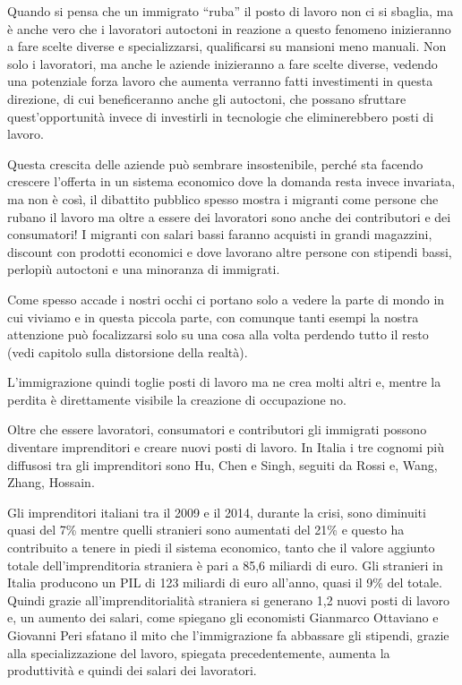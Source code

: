 \documentclass[12pt]{book} %
\begin{document}
Quando si pensa che un immigrato “ruba” il posto di lavoro non ci si sbaglia, ma è anche vero che i lavoratori autoctoni
in reazione a questo fenomeno inizieranno a fare scelte diverse e specializzarsi, qualificarsi su mansioni meno
manuali. Non solo i lavoratori, ma anche le aziende inizieranno a fare scelte diverse, vedendo una potenziale forza
lavoro che aumenta verranno fatti investimenti in questa direzione, di cui beneficeranno anche gli autoctoni, che
possano sfruttare quest'opportunità invece di investirli in tecnologie che eliminerebbero posti di
lavoro.

Questa crescita delle aziende può sembrare insostenibile, perché sta facendo crescere l'offerta in
un sistema economico dove la domanda resta invece invariata, ma non è così, il dibattito pubblico spesso mostra i
migranti come persone che rubano il lavoro ma oltre a essere dei lavoratori sono anche dei contributori e dei
consumatori! I migranti con salari bassi faranno acquisti in grandi magazzini, discount con prodotti economici e dove
lavorano altre persone con stipendi bassi, perlopiù autoctoni e una minoranza di immigrati.

Come spesso accade i nostri occhi ci portano solo a vedere la parte di mondo in cui viviamo e in questa piccola parte,
con comunque tanti esempi la nostra attenzione può focalizzarsi solo su una cosa alla volta perdendo tutto il resto
(vedi capitolo sulla distorsione della realtà).

L'immigrazione quindi toglie posti di lavoro ma ne crea molti altri e, mentre la perdita è
direttamente visibile la creazione di occupazione no.

Oltre che essere lavoratori, consumatori e contributori gli immigrati possono diventare imprenditori e creare nuovi
posti di lavoro. In Italia i tre cognomi più diffusosi tra gli imprenditori sono Hu, Chen e Singh, seguiti da Rossi e,
Wang, Zhang,
Hossain.

Gli imprenditori italiani tra il 2009 e il 2014, durante la crisi, sono diminuiti quasi del 7\% mentre quelli stranieri
sono aumentati del 21\% e questo ha contribuito a tenere in piedi il sistema economico, tanto che il valore aggiunto
totale dell'imprenditoria straniera è pari a 85,6 miliardi di
euro. Gli stranieri in Italia producono un PIL di 123 miliardi di euro all'anno, quasi il 9\% del
totale. Quindi grazie all'imprenditorialità straniera si generano 1,2 nuovi posti di lavoro e, un
aumento dei salari, come spiegano gli economisti Gianmarco Ottaviano e
Giovanni Peri sfatano il mito che l'immigrazione fa abbassare gli stipendi, grazie alla
specializzazione del lavoro, spiegata precedentemente, aumenta la produttività e quindi dei salari dei
lavoratori. 
\end{document}
